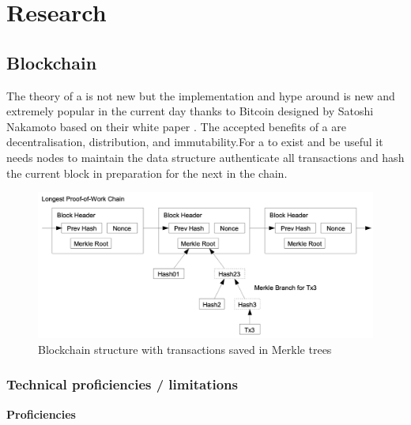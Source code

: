 \section{Research}
\subsection{Blockchain}

The theory of a  is not new \cite{origins_blockchain} but the implementation and hype around  is new and extremely popular in the current day thanks to Bitcoin designed by Satoshi Nakamoto based on their white paper \cite{nakamoto2008bitcoin}. The accepted benefits of a  are decentralisation, distribution, and immutability.For a  to exist and be useful it needs nodes to maintain the data structure authenticate all transactions and hash the current block in preparation for the next in the chain.

\begin{figure}[H]
\caption{Blockchain structure with transactions saved in Merkle trees\cite{btc-white}}
\centering
\includegraphics[width=\textwidth,height=0.4\textheight,keepaspectratio]{images/patterns/merkle}
\centering
\end{figure}

\subsubsection{Technical proficiencies / limitations}

{\noindent\regular\textbf{Proficiencies}\vspace{2mm}}

